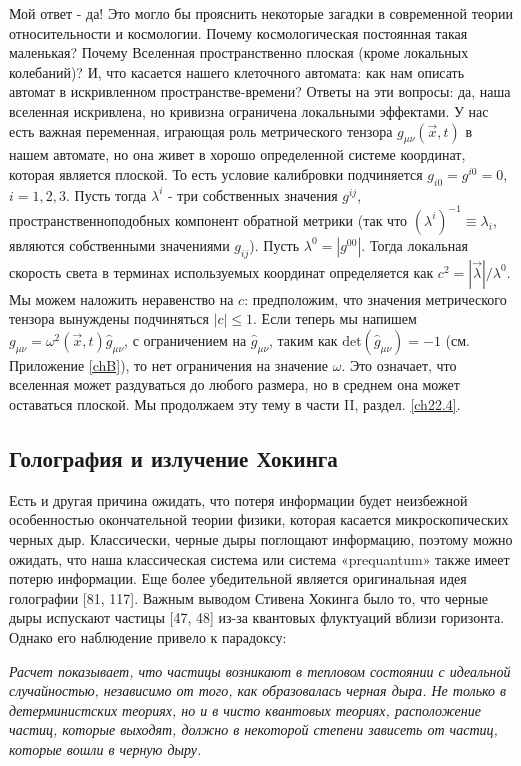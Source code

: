 \documentclass[main.tex]{subfiles}
\begin{document}
Мой ответ - да! Это могло бы прояснить некоторые загадки в современной теории относительности и космологии. Почему космологическая постоянная такая маленькая? Почему Вселенная пространственно плоская (кроме локальных колебаний)? И, что касается нашего клеточного автомата: как нам описать автомат в искривленном пространстве-времени?
Ответы на эти вопросы: да, наша вселенная искривлена, но кривизна ограничена локальными эффектами. У нас есть важная переменная, играющая роль метрического тензора $g_{\mu\nu}(\vec x, t)$ в нашем автомате, но она живет в хорошо определенной системе координат, которая является плоской. То есть условие калибровки подчиняется $g_{i0} = g^{i0} = 0$, $i = 1, 2, 3$. Пусть тогда $\lambda^i$ - три собственных значения $g^{ij}$, пространственноподобных компонент обратной метрики (так что $(\lambda^i)^{-1}\equiv\lambda_i $, являются собственными значениями $g_{ij}$). Пусть $\lambda^0 = |g^{00}|$. Тогда локальная скорость света в терминах используемых координат определяется как $c^2 = | \vec\lambda | / \lambda^0$. Мы можем наложить неравенство на $c$: предположим, что значения метрического тензора вынуждены подчиняться $| c | \le 1$. Если теперь мы напишем $g_{\mu\nu} = \omega^2(\vec x, t)\hat g_{\mu\nu}$, с ограничением на $\hat g_{\mu\nu}$, таким как  $\mathrm{det}(\hat g_{\mu\nu}) = -1$ (см. Приложение \ref{chB}), то нет ограничения на значение $\omega$. Это означает, что вселенная может раздуваться до любого размера, но в среднем она может оставаться плоской.
Мы продолжаем эту тему в части II, раздел. \ref{ch22.4}.

\subsection{Голография и излучение Хокинга}\label{ch9.4}

Есть и другая причина ожидать, что потеря информации будет неизбежной особенностью окончательной теории физики, которая касается микроскопических черных дыр. Классически, черные дыры поглощают информацию, поэтому можно ожидать, что наша классическая система или система «prequantum» также имеет потерю информации. Еще более убедительной является оригинальная идея голографии [81, 117]. Важным выводом Стивена Хокинга было то, что черные дыры испускают частицы [47, 48] из-за квантовых флуктуаций вблизи горизонта. Однако его наблюдение привело к парадоксу:

\textit{Расчет показывает, что частицы возникают в тепловом состоянии с идеальной случайностью, независимо от того, как образовалась черная дыра. Не только в детерминистских теориях, но и в чисто квантовых теориях, расположение частиц, которые выходят, должно в некоторой степени зависеть от частиц, которые вошли в черную дыру.}
\end{document}
